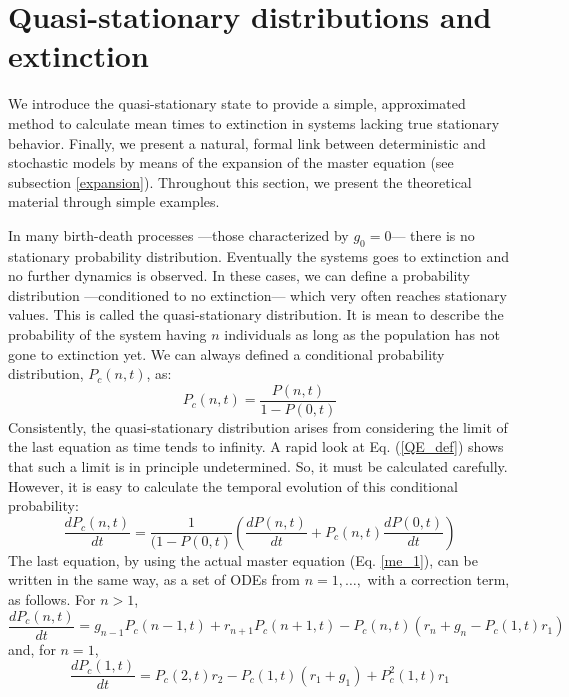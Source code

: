 \section{Quasi-stationary distributions and extinction}
\label{quasi-stationary}

We introduce the quasi-stationary state to provide a simple, approximated method to calculate mean times to extinction in systems lacking true stationary behavior. Finally, we present a natural, formal link between deterministic and stochastic models by means of the expansion of the master equation (see subsection \ref{expansion}). Throughout this section, we present the theoretical material through simple examples.

In many birth-death processes ---those characterized by $g_0=0$--- there is no stationary probability distribution. Eventually the systems goes to extinction and no further dynamics is observed. In these cases, we can define a probability distribution ---conditioned to no extinction--- which very often reaches stationary values. This is called the quasi-stationary distribution. It is mean to describe the probability of the system having $n$ individuals as long as the population has not gone to extinction yet. We can always defined a conditional probability distribution, $P_c(n,t)$, as:
\begin{equation}
  \label{QE_def}
  P_c(n,t) = \frac{P(n,t)}{1-P(0,t)}
\end{equation}
Consistently, the quasi-stationary distribution arises from considering the limit of the last equation as time tends to infinity. A rapid look at Eq. (\ref{QE_def}) shows that such a limit is in principle undetermined. So, it must be calculated carefully. However, it is easy to calculate the temporal evolution of this conditional probability:
\begin{equation}
  \frac{dP_c(n,t)}{dt} =  \frac{1}{(1 - P(0,t)}\left(\frac{dP(n,t)}{dt} + P_c(n,t)\frac{dP(0,t)}{dt}\right)
\end{equation}
The last equation, by using the actual master equation (Eq. \ref{me_1}), can be written in the same way, as a set of ODEs from $n=1, \dots, $ with a correction term, as follows. For $n>1$,
\begin{equation}
  \label{QE_1}
  \frac{dP_c(n,t)}{dt} = g_{n-1} P_c(n-1,t) + r_{n+1} P_c(n+1,t) - P_c(n,t)\left(r_n + g_n - P_c(1,t)r_1\right)
\end{equation}
and, for $n=1$,
\begin{equation}
  \label{QE_2}
  \frac{dP_c(1,t)}{dt} = P_c(2,t) r_2 - P_c(1,t)\left(r_1 + g_1\right) + P_c^2(1,t) r_1
\end{equation}

